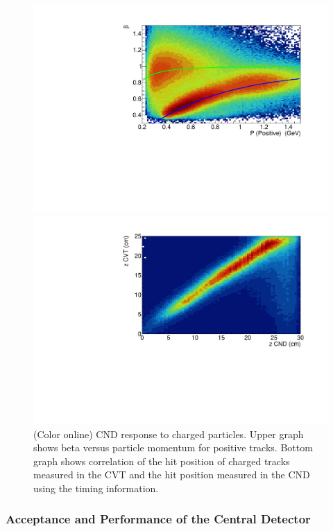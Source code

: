 \documentclass[final,3p,twocolumn]{elsarticle}
\begin{document}
\begin{figure}[t!]
\centerline{\includegraphics[width=1.0\columnwidth]{CND-betaP.pdf}}
\centerline{\includegraphics[width=1.0\columnwidth]{CND-z.pdf}}
\caption{(Color online) CND response to charged particles. Upper graph shows beta versus particle momentum for positive tracks. 
Bottom graph shows correlation of the hit position of charged tracks measured in the CVT and the hit position measured 
in the CND using the timing information.}
\label{cnd-performance}
\end{figure}

\subsubsection{Acceptance and Performance of the Central Detector} 
\end{document}
